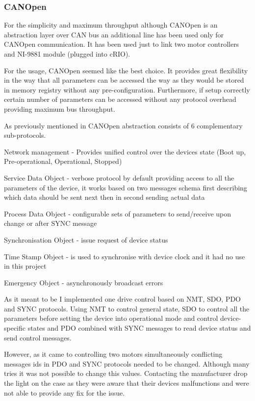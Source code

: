 \subsubsection{CANOpen}
For the simplicity and maximum throughput although CANOpen is an abstraction layer over CAN bus an additional line has been used only for CANOpen communication. It has been used just to link two motor controllers and NI-9881 module (plugged into cRIO).

For the usage, CANOpen seemed like the best choice. It provides great flexibility in the way that all parameters can be accessed the way as they would be stored in memory registry without any pre-configuration. Furthermore, if setup correctly certain number of parameters can be accessed without any protocol overhead providing maximum bus throughput.

As previously mentioned in  CANOpen abstraction consists of 6 complementary sub-protocols.
\begin{description}[labelindent=1cm]
    \item[NMT] Network management - Provides unified control over the devices state (Boot up, Pre-operational, Operational, Stopped)
    \item[SDO] Service Data Object - verbose protocol by default providing access to all the parameters of the device, it works based on two messages schema first describing which data should be sent next then in second sending actual data
    \item[PDO] Process Data Object - configurable sets of parameters to send/receive upon change or after SYNC message
    \item[SYNC]	Synchronisation Object - issue request of device status
    \item[TIME]	Time Stamp Object - is used to synchronise with device clock and it had no use in this project
    \item[EMCY] Emergency Object - asynchronously broadcast errors
\end{description}

As it meant to be I implemented one drive control based on NMT, SDO, PDO and SYNC protocols. Using NMT to control general state, SDO to control all the parameters before setting the device into operational mode and control device-specific states and PDO combined with SYNC messages to read device status and send control messages.

However, as it came to controlling two motors simultaneously conflicting messages ids in PDO and SYNC protocols needed to be changed. Although many tries it was not possible to change this values. Contacting the manufacturer drop the light on the case as they were aware that their devices malfunctions and were not able to provide any fix for the issue.

